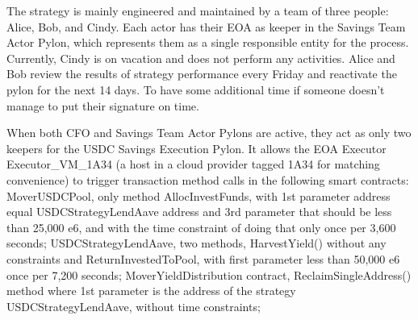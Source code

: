 \documentclass[12pt]{article}
\begin{document}
The strategy is mainly engineered and maintained by a team of three people: Alice, Bob, and Cindy. Each actor has their EOA as keeper in the Savings Team Actor Pylon, which represents them as a single responsible entity for the process. Currently, Cindy is on vacation and does not perform any activities. Alice and Bob review the results of strategy performance every Friday and reactivate the pylon for the next 14 days. To have some additional time if someone doesn’t manage to put their signature on time.

When both CFO and Savings Team Actor Pylons are active, they act as only two keepers for the USDC Savings Execution Pylon. It allows the EOA Executor Executor\_VM\_1A34 (a host in a cloud provider tagged 1A34 for matching convenience) to trigger transaction method calls in the following smart contracts: MoverUSDCPool, only method AllocInvestFunds, with 1st parameter address equal USDCStrategyLendAave address and 3rd parameter that should be less than 25,000 e6, and with the time constraint of doing that only once per 3,600 seconds; USDCStrategyLendAave, two methods, HarvestYield() without any constraints and ReturnInvestedToPool, with first parameter less than 50,000 e6 once per 7,200 seconds; MoverYieldDistribution contract, ReclaimSingleAddress() method where 1st parameter is the address of the strategy USDCStrategyLendAave, without time constraints;
\end{document}
